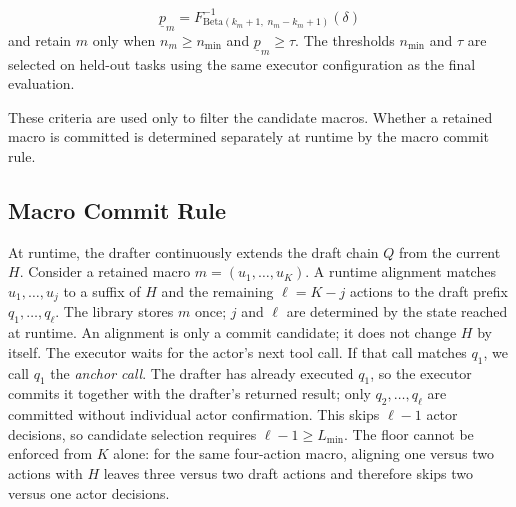 \begin{equation}
    \underline{p}_m =
F^{-1}_{\mathrm{Beta}(k_m+1,\; n_m-k_m+1)}(\delta)
\end{equation}
and retain $m$ only when $n_m \ge n_{\min}$ and $\underline{p}_m \ge \tau$. 
The thresholds $n_{\min}$ and $\tau$ are selected on held-out tasks using the same executor configuration as the final evaluation.

These criteria are used only to filter the candidate macros.
Whether a retained macro is committed is determined separately at runtime by the macro commit rule.

\subsection{Macro Commit Rule}
\label{sec:commit}

At runtime, the drafter continuously extends the draft chain $Q$ from the current $H$. Consider a retained macro $m=(u_1,\ldots,u_K)$. A runtime alignment matches $u_1,\ldots,u_j$ to a suffix of $H$ and the remaining $\ell=K-j$ actions to the draft prefix $q_1,\ldots,q_\ell$. The library stores $m$ once; $j$ and $\ell$ are determined by the state reached at runtime.
An alignment is only a commit candidate; it does not change $H$ by itself. The executor waits for the actor's next tool call. If that call matches $q_1$, we call $q_1$ the \emph{anchor call}. The drafter has already executed $q_1$, so the executor commits it together with the drafter's returned result; only $q_2,\ldots,q_\ell$ are committed without individual actor confirmation. This skips $\ell-1$ actor decisions, so candidate selection requires $\ell-1 \ge L_{\min}$. The floor cannot be enforced from $K$ alone: for the same four-action macro, aligning one versus two actions with $H$ leaves three versus two draft actions and therefore skips two versus one actor decisions.


